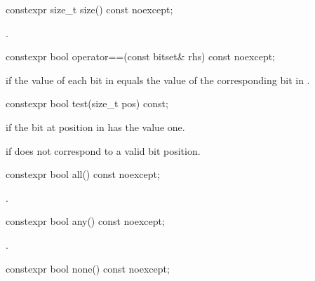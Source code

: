 %
\begin{itemdecl}
constexpr size_t size() const noexcept;
\end{itemdecl}

\begin{itemdescr}
\pnum
\returns
{}.
\end{itemdescr}

%
\begin{itemdecl}
constexpr bool operator==(const bitset& rhs) const noexcept;
\end{itemdecl}

\begin{itemdescr}
\pnum
\returns
{} if the value of each bit in
equals the value of the corresponding bit in .
\end{itemdescr}

%
\begin{itemdecl}
constexpr bool test(size_t pos) const;
\end{itemdecl}

\begin{itemdescr}
\pnum
\returns
{}
if the bit at position 
in
has the value one.

\pnum
\throws
{}%
 if  does not correspond to a valid bit position.
\end{itemdescr}

%
\begin{itemdecl}
constexpr bool all() const noexcept;
\end{itemdecl}

\begin{itemdescr}
\pnum
\returns
{}.
\end{itemdescr}

%
%
\begin{itemdecl}
constexpr bool any() const noexcept;
\end{itemdecl}

\begin{itemdescr}
\pnum
\returns
{}.
\end{itemdescr}

%
\begin{itemdecl}
constexpr bool none() const noexcept;
\end{itemdecl}

